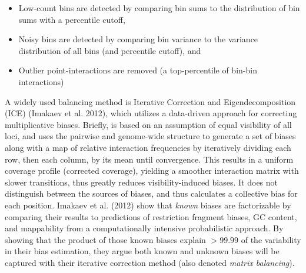 \documentclass[
  11pt,
  a4paper,
]{scrbook}
\providecommand{\tightlist}{%
  \setlength{\itemsep}{0pt}\setlength{\parskip}{0pt}}\usepackage{longtable,booktabs,array}
\let\oldemph\emph
\renewcommand\emph[1]{\oldemph{\color{gray}#1}}
\begin{document}
\begin{itemize}
\tightlist
\item
  Low-count bins are detected by comparing bin sums to the distribution
  of bin sums with a percentile cutoff,
\item
  Noisy bins are detected by comparing bin variance to the variance
  distribution of all bins (and percentile cutoff), and
\item
  Outlier point-interactions are removed (a top-percentile of bin-bin
  interactions)
\end{itemize}

A widely used balancing method is Iterative Correction and
Eigendecomposition (ICE) (Imakaev et al. 2012), which utilizes a
data-driven approach for correcting multiplicative biases. Briefly, is
based on an assumption of equal visibility of all loci, and uses the
pairwise and genome-wide structure to generate a set of biases along
with a map of relative interaction frequencies by iteratively dividing
each row, then each column, by its mean until convergence. This results
in a uniform coverage profile (corrected coverage), yielding a smoother
interaction matrix with slower transitions, thus greatly reduces
visibility-induced biases. It does not distinguish between the sources
of biases, and thus calculates a collective bias for each position.
Imakaev et al. (2012) show that \emph{known} biases are factorizable by
comparing their results to predictions of restriction fragment biases,
GC content, and mappability from a computationally intensive
probabilistic approach. By showing that the product of those known
biases explain \(>99.99%
\) of the variability in their bias estimation, they argue both known
and unknown biases will be captured with their iterative correction
method (also denoted \emph{matrix balancing}).
\end{document}
